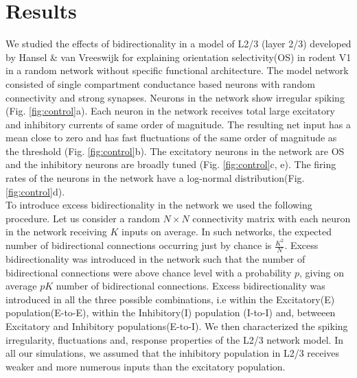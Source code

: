 \section{Results}
We studied the effects of bidirectionality in a model of L2/3 (layer 2/3) developed by Hansel \& van Vreeswijk \cite{Hansel2012} for explaining orientation selectivity(OS) in rodent V1 in a random network without specific functional architecture. The model network consisted of single compartment conductance based neurons with random connectivity and strong synapses. Neurons in the network show irregular spiking (Fig. \ref{fig:control}a). Each neuron in the network receives total large excitatory and inhibitory currents of same order of magnitude. The resulting net input has a mean close to zero and has fast fluctuations of the same order of magnitude as the threshold (Fig. \ref{fig:control}b). The excitatory neurons in the network are OS and the inhibitory neurons are broadly tuned (Fig. \ref{fig:control}c, e). The firing rates of the neurons in the network have a log-normal distribution(Fig. \ref{fig:control}d).  \\

To introduce excess bidirectionality in the network we used the following procedure. Let us consider a random $N \times N$ connectivity matrix with each neuron in the network receiving $K$ inputs on average. In such networks, the expected number of bidirectional connections occurring just by chance is $\frac{K^2}{N}$. Excess bidirectionality was introduced in the network such that the number of bidirectional connections were above chance level with a probability $p$, giving on average $pK$ number of bidirectional connections.
Excess bidirectionality was introduced in all the three possible combinations, i.e within the Excitatory(E) population(E-to-E), within the Inhibitory(I) population (I-to-I) and, betweeen Excitatory and Inhibitory populations(E-to-I). We then characterized the spiking irregularity, fluctuations and, response properties of the L2/3 network model. In all our simulations, we assumed that the inhibitory population in L2/3 receives weaker and more numerous inputs than the excitatory population.   \\

